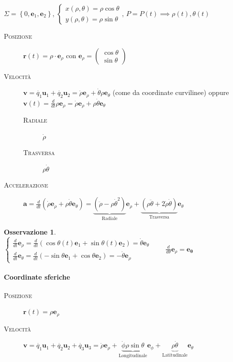 \documentclass[a4paper,10pt]{article}
\theoremstyle{definition}
\newcommand{\bv}{\boldsymbol} %
\newcommand{\cv}[2]{\begin{pmatrix} #1 \\ #2 \end{pmatrix}} %
\newcommand{\mylist}[1]{\textnormal{\textsc{#1}}}
\theoremstyle{indentdefinition}
\theoremstyle{indenttheorem}
\theoremstyle{myremark}
\newtheorem*{rem*}{Osservazione}
\theoremstyle{indentgeneral}
\begin{document}
$\Sigma=\left\{ 0,\boldsymbol{e}_{1},\boldsymbol{e}_{2}\right\} $,
$\begin{cases}
x(\rho,\theta)=\rho\cos\theta\\
y(\rho,\theta)=\rho\sin\theta
\end{cases}$, $P=P(t) \implies \rho(t), \theta(t)$
\begin{description}

\item [\mylist{Posizione}] $\boldsymbol{r}\left(t\right)=\rho\cdot\boldsymbol{e}_{\rho}$
con $\boldsymbol{e}_{\rho}=\cv{\cos\theta}{\sin\theta}$
\item [\mylist{Velocità}] $\boldsymbol{v}=\dot{q_1}\bv{u}_1+\dot{q_2}\bv{u}_2=\dot{\rho}\bv{e}_\rho+\dot{\theta}\rho\bv{e}_\theta$ (come da coordinate curvilinee) oppure $\bv{v}(t)=\frac{d}{dt}\rho\bv{e}_\rho=\dot{\rho}\bv{e}_\rho+\rho\dot{\theta}\bv{e}_\theta$
\begin{description}
    \item [\mylist{Radiale}] $\dot{\rho}$
    \item [\mylist{Trasversa}] $\rho\dot{\theta}$
\end{description}
\item [\mylist{Accelerazione}] $\boldsymbol{a}=\frac{d}{dt}\left(\dot{\rho}\boldsymbol{e}_{\rho}+\rho\dot{\theta}\boldsymbol{e}_{\theta}\right)=\underbrace{\left(\ddot{\rho}-\rho\dot{\theta}^{2}\right)}_{\text{Radiale}}\boldsymbol{e}_{\rho}+\underbrace{\left(\rho\ddot{\theta}+2\dot{\rho}\dot{\theta}\right)}_{\text{Trasversa}}\boldsymbol{e}_{\theta}$
\end{description}
\begin{rem*}
    $\begin{cases}
        \frac{d}{dt}\bv{e}_\rho=\frac{d}{dt}(\cos\theta(t)\bv{e}_1+\sin\theta(t)\bv{e}_2 )=\dot{\theta}\bv{e}_\theta \\
        \frac{d}{dt}\bv{e}_\theta=\frac{d}{dt}(-\sin\theta\bv{e}_1+\cos\theta\bv{e}_2)= -\dot{\theta}\bv{e}_\rho
        
    \end{cases} \qquad \frac{d}{d\theta}\bv{e}_\rho= \bv{e_\theta}$
\end{rem*}

\paragraph{Coordinate sferiche} 
\begin{description}
    \item[\mylist{Posizione}] $\bv{r}(t)=\rho\bv{e}_\rho$
    \item[\mylist{Velocità}] $\bv{v}=\dot{q_1}\bv{u}_1+\dot{q_2}\bv{u}_2+\dot{q_3}\bv{u}_3=\dot{\rho}\bv{e}_\rho+\underbrace{\dot{\phi}\rho\sin\theta}_{\text{Longitudinale}}\bv{e}_\phi+\underbrace{\rho\dot{\theta}}_{\text{Latitudinale}}\bv{e}_\theta $ 
\end{description}
\end{document}
